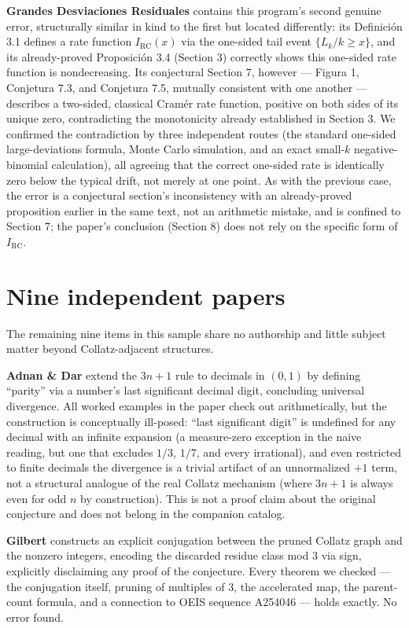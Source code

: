 \documentclass[11pt]{article}
\begin{document}
\textbf{Grandes Desviaciones Residuales} \cite{RuizCastillo2026g}
contains this program's second genuine error, structurally similar in
kind to the first but located differently: its Definición 3.1 defines
a rate function $I_{\mathrm{RC}}(x)$ via the one-sided tail event
$\{L_k/k \ge x\}$, and its already-proved Proposición 3.4 (Section 3)
correctly shows this one-sided rate function is nondecreasing. Its
conjectural Section 7, however --- Figura 1, Conjetura 7.3, and
Conjetura 7.5, mutually consistent with one another --- describes a
two-sided, classical Cramér rate function, positive on both sides of
its unique zero, contradicting the monotonicity already established in
Section 3. We confirmed the contradiction by three independent routes
(the standard one-sided large-deviations formula, Monte Carlo
simulation, and an exact small-$k$ negative-binomial calculation), all
agreeing that the correct one-sided rate is identically zero below the
typical drift, not merely at one point. As with the previous case, the
error is a conjectural section's inconsistency with an already-proved
proposition earlier in the same text, not an arithmetic mistake, and is
confined to Section 7; the paper's conclusion (Section 8) does not rely
on the specific form of $I_{\mathrm{RC}}$.

\section{Nine independent papers}
\label{sec:others}

The remaining nine items in this sample share no authorship and little
subject matter beyond Collatz-adjacent structures.

\textbf{Adnan \& Dar} \cite{AdnanDar2026} extend the $3n+1$ rule to
decimals in $(0,1)$ by defining ``parity'' via a number's last
significant decimal digit, concluding universal divergence. All worked
examples in the paper check out arithmetically, but the construction is
conceptually ill-posed: ``last significant digit'' is undefined for any
decimal with an infinite expansion (a measure-zero exception in the
naive reading, but one that excludes $1/3$, $1/7$, and every
irrational), and even restricted to finite decimals the divergence is a
trivial artifact of an unnormalized $+1$ term, not a structural analogue
of the real Collatz mechanism (where $3n+1$ is always even for odd $n$
by construction). This is not a proof claim about the original
conjecture and does not belong in the companion catalog.

\textbf{Gilbert} \cite{Gilbert2026} constructs an explicit conjugation
between the pruned Collatz graph and the nonzero integers, encoding the
discarded residue class mod 3 via sign, explicitly disclaiming any
proof of the conjecture. Every theorem we checked --- the conjugation
itself, pruning of multiples of 3, the accelerated map, the parent-count
formula, and a connection to OEIS sequence A254046 --- holds exactly.
No error found.
\end{document}
